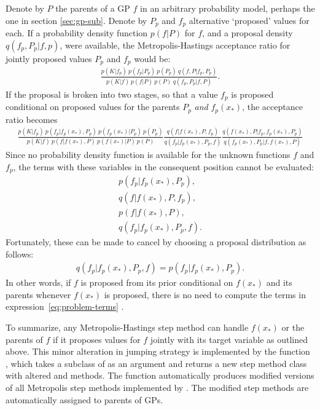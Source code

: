 \documentclass[article]{jss}
\begin{document}
Denote by $P$ the parents of a GP $f$ in an arbitrary probability model, perhaps the one in section \ref{sec:gp-sub}. Denote by $P_p$ and $f_p$ alternative `proposed' values for each. If a probability density function $p(f|P)$ for $f$, and a proposal density $q(f_p,P_p|f,p)$, were available, the Metropolis-Hastings acceptance ratio for jointly proposed values $P_p$ and $f_p$ would be:
\begin{eqnarray*}
    \frac{p(K|f_p)\ p(f_p|P_p)\ p(P_p)\ q(f,P|f_p,P_p)}{p(K|f)\ p(f|P)\ p(P)\ q(f_p,P_p|f,P)}.
\end{eqnarray*}
If the proposal is broken into two stages, so that a value $f_p$ is proposed conditional on proposed values for the parents $P_p$ \emph{and} $f_p(x_*)$, the acceptance ratio becomes
\begin{eqnarray*}
    \frac{p(K|f_p)\ p(f_p|f_p(x_*), P_p)\ p(f_p(x_*) | P_p)\ p(P_p)}{p(K|f)\ p(f|f(x_*), P)\ p(f(x_*) | P)\ p(P)}
    \frac{q(f|f(x_*),P,f_p)  }{q(f_p|f_p(x_*),P_p,f)}
    \frac{q(f(x_*),P|f_p,f_p(x_*),P_p)}{q(f_p(x_*),P_p|f,f(x_*), P)}
\end{eqnarray*}
Since no probability density function is available for the unknown functions $f$ and $f_p$, the terms with these variables in the consequent position cannot be evaluated:
\begin{equation}
    \label{eq:problem-terms} 
    \begin{array}{r}
        p(f_p|f_p(x_*), P_p),\\ q(f|f(x_*),P,f_p),\\ p(f|f(x_*), P),\\ q(f_p|f_p(x_*), P_p, f).
    \end{array}
\end{equation}
Fortunately, these can be made to cancel by choosing a proposal distribution as follows:
\begin{eqnarray*}
    q(f_p|f_p(x_*),P_p,f) = p(f_p|f_p(x_*), P_p).
\end{eqnarray*}
In other words, if $f$ is proposed from its prior conditional on $f(x_*)$ and its parents whenever $f(x_*)$ is proposed, there is no need to compute the terms in expression~\ref{eq:problem-terms} .

\smallskip

To summarize, any Metropolis-Hastings step method can handle $f(x_*)$ or the parents of $f$ if it proposes values for $f$ jointly with its target variable as outlined above. This minor alteration in jumping strategy is implemented by the function \\, which takes a subclass of  as an argument and returns a new step method class with altered  and  methods. The function automatically produces modified versions of all Metropolis step methods implemented by  \citep{pymc}. The modified step methods are automatically assigned to parents of GPs.
\end{document}
